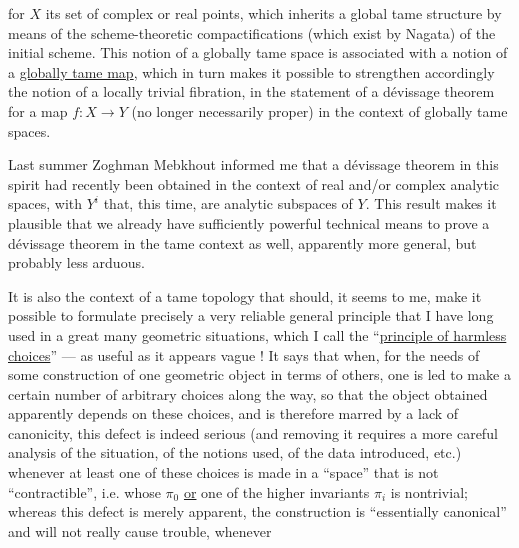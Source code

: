 
for $X$ its set of complex or real points, which inherits
a global tame structure by means of the scheme-theoretic
compactifications (which exist by Nagata) of the initial scheme.
This notion of a globally tame space is associated with a notion
of a \uline{globally tame map}, which in turn makes it possible to
strengthen accordingly the notion of a locally trivial
fibration, in the statement of a dévissage theorem for a
map $f : X \longrightarrow Y$ (no longer necessarily proper) in
the context of globally tame spaces.

Last summer Zoghman Mebkhout informed me
that a dévissage theorem in this spirit had recently been obtained
in the context of real and/or complex analytic spaces,
with $Y^{i}$ that, this time, are analytic subspaces
of $Y$. This result makes it plausible that we already have
sufficiently powerful technical means to prove
a dévissage theorem in the tame context as well, apparently
more general, but probably less arduous.

It is also the context of a tame topology
that should, it seems to me, make it possible to formulate precisely
a very reliable general principle that I have long used in
a great many geometric situations, which I call the
``\uline{principle of harmless choices}'' --- as useful as it appears vague !
It says that when, for the needs of some construction
of one geometric object in terms of others, one is led to make
a certain number of arbitrary choices along the way, so
that the object obtained apparently depends on these choices, and is
therefore marred by a lack of canonicity, this defect is indeed
serious (and removing it requires a more careful analysis of
the situation, of the notions used, of the data introduced, etc.)
whenever at least one of these choices is made in a
``space'' that is not ``contractible'', i.e. whose $\pi_{0}$ \uline{or} one of
the higher invariants $\pi_{i}$ is nontrivial; whereas this defect is
merely apparent, the construction is ``essentially
canonical'' and will not really cause trouble, whenever

